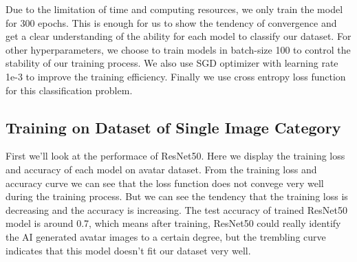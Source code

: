 \documentclass[conference]{IEEEtran}
\begin{document}
Due to the limitation of time and computing resources, we only train the model for 300 epochs. This is enough for us to show the tendency of convergence and get a clear understanding of the ability for each model to classify our dataset. For other hyperparameters, we choose to train models in batch-size 100 to control the stability of our training process.
We also use SGD optimizer with learning rate 1e-3 to improve the training efficiency. Finally we use cross entropy loss function for this classification problem.

\subsection{Training on Dataset of Single Image Category}

First we'll look at the performace of ResNet50. Here we display the training loss and accuracy of each model on avatar dataset. From the training loss and accuracy curve we can see that the loss function does not convege very well during the training process. But we can see the tendency that the training loss is decreasing and the accuracy is increasing. The test accuracy of
trained ResNet50 model is around 0.7, which means after training, ResNet50 could really identify the AI generated avatar images to a certain degree, but the trembling curve indicates that this model doesn't fit our dataset very well.
\end{document}
